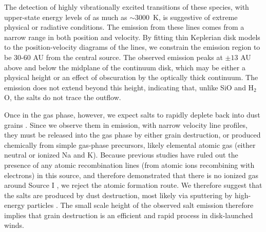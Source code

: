\documentclass[12pt]{article}
\newcommand{\water}{H$_{2}$O\xspace}		%
\begin{document}
The detection of highly vibrationally excited transitions of these species, with upper-state energy levels of as much as $\sim$3000~K, is suggestive of extreme physical or radiative conditions.  The emission from these lines comes from a narrow range in both position and velocity.  By fitting thin Keplerian disk models to the position-velocity diagrams of the lines, we constrain the emission region to be 30-60 AU from the central source.  The observed emission peaks at $\pm13$ AU above and below the midplane of the continuum disk, which may be either a physical height or an effect of obscuration by the optically thick continuum.  The emission does not extend beyond this height, indicating that, unlike SiO and \water, the salts do not trace the outflow.


Once in the gas phase, however, we expect salts to rapidly deplete back into dust grains \cite{Cherncheff2012a}.  Since we observe them in emission, with narrow velocity line profiles, they must be released into the gas phase by either grain destruction, or produced chemically from simple gas-phase precursors, likely elemental atomic gas (either neutral or ionized Na and K).  Because previous studies have ruled out the presence of any atomic recombination lines (from atomic ions recombining with electrons) in this source, and therefore demonstrated that there is no ionized gas around Source I \cite{Plambeck2016a,Baez-Rubio2018a}, we reject the atomic formation route. We therefore suggest that the salts are produced by dust destruction, most likely via sputtering by high-energy particles \cite{Schilke1997a}.  The small scale height of the observed salt emission therefore implies that grain destruction is an efficient and rapid process in disk-launched winds.

\end{document}
